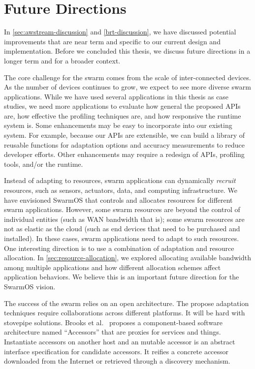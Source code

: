 \documentclass[thesis.tex]{subfiles}
\begin{document}
\section{Future Directions}
\label{sec:future-directions}

In \autoref{sec:awstream-discussion} and \autoref{brt-discussion}, we have
discussed potential improvements that are near term and specific to our current
design and implementation. Before we concluded this thesis, we discuss future
directions in a longer term and for a broader context.

 The core challenge for the
swarm comes from the scale of inter-connected devices. As the number of devices
continues to grow, we expect to see more diverse swarm applications. While we
have used several applications in this thesis as case studies, we need more
applications to evaluate how general the proposed APIs are, how effective the
profiling techniques are, and how responsive the runtime system is. Some
enhancements may be easy to incorporate into our existing system. For example,
because our APIs are extensible, we can build a library of reusable functions
for adaptation options and accuracy measurements to reduce developer
efforts. Other enhancements may require a redesign of APIs, profiling tools,
and/or the runtime.

 Instead of adapting to resources,
swarm applications can dynamically \emph{recruit} resources, such as sensors,
actuators, data, and computing infrastructure. We have envisioned SwarmOS that
controls and allocates resources for different swarm applications. However, some
swarm resources are beyond the control of individual entities (such as WAN
bandwidth that is); some swarm resources are not as elastic as the cloud (such
as end devices that need to be purchased and installed). In these cases, swarm
applications need to adapt to such resources. One interesting direction is to
use a combination of adaptation and resource allocation. In
\autoref{sec:resource-allocation}, we explored allocating available bandwidth
among multiple applications and how different allocation schemes affect
application behaviors. We believe this is an important future direction for the
SwarmOS vision.

 The success of the swarm relies on an
open architecture. The propose adaptation techniques require collaborations
across different platforms. It will be hard with stovepipe solutions. Brooks et
al.~\cite{brooks2018component} proposes a component-based software architecture
named ``Accessors'' that are proxies for services and things. Instantiate
accessors on another host and an mutable accessor is an abstract interface
specification for candidate accessors. It reifies a concrete accessor downloaded
from the Internet or retrieved through a discovery mechanism.
\end{document}
